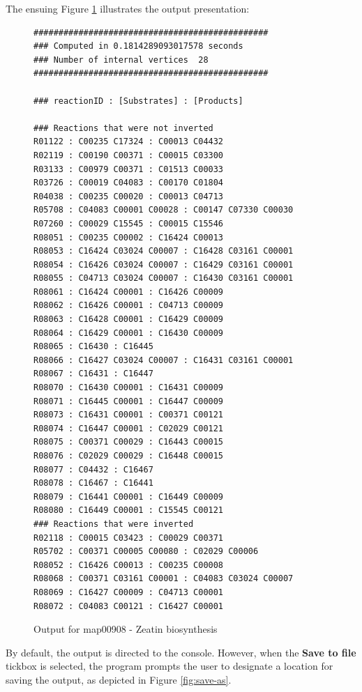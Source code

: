 The ensuing Figure \ref{fig:output-map00908} illustrates the output presentation:

\begin{figure}[H]
    \centering
    \begin{framed}
    \begin{small}
    \begin{verbatim}
###############################################
### Computed in 0.1814289093017578 seconds
### Number of internal vertices  28
###############################################

### reactionID : [Substrates] : [Products]

### Reactions that were not inverted
R01122 : C00235 C17324 : C00013 C04432
R02119 : C00190 C00371 : C00015 C03300
R03133 : C00979 C00371 : C01513 C00033
R03726 : C00019 C04083 : C00170 C01804
R04038 : C00235 C00020 : C00013 C04713
R05708 : C04083 C00001 C00028 : C00147 C07330 C00030
R07260 : C00029 C15545 : C00015 C15546
R08051 : C00235 C00002 : C16424 C00013
R08053 : C16424 C03024 C00007 : C16428 C03161 C00001
R08054 : C16426 C03024 C00007 : C16429 C03161 C00001
R08055 : C04713 C03024 C00007 : C16430 C03161 C00001
R08061 : C16424 C00001 : C16426 C00009
R08062 : C16426 C00001 : C04713 C00009
R08063 : C16428 C00001 : C16429 C00009
R08064 : C16429 C00001 : C16430 C00009
R08065 : C16430 : C16445
R08066 : C16427 C03024 C00007 : C16431 C03161 C00001
R08067 : C16431 : C16447
R08070 : C16430 C00001 : C16431 C00009
R08071 : C16445 C00001 : C16447 C00009
R08073 : C16431 C00001 : C00371 C00121
R08074 : C16447 C00001 : C02029 C00121
R08075 : C00371 C00029 : C16443 C00015
R08076 : C02029 C00029 : C16448 C00015
R08077 : C04432 : C16467
R08078 : C16467 : C16441
R08079 : C16441 C00001 : C16449 C00009
R08080 : C16449 C00001 : C15545 C00121
### Reactions that were inverted
R02118 : C00015 C03423 : C00029 C00371
R05702 : C00371 C00005 C00080 : C02029 C00006
R08052 : C16426 C00013 : C00235 C00008
R08068 : C00371 C03161 C00001 : C04083 C03024 C00007
R08069 : C16427 C00009 : C04713 C00001
R08072 : C04083 C00121 : C16427 C00001
    \end{verbatim}
    \end{small}
    \end{framed}
    \caption{Output for map00908 - Zeatin biosynthesis}
    \label{fig:output-map00908}
\end{figure}

By default, the output is directed to the console. However, when the \textbf{Save to file} tickbox is selected, the program prompts the user to designate a location for saving the output, as depicted in Figure \ref{fig:save-as}.

